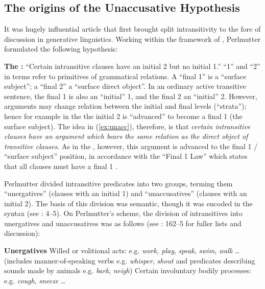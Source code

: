 \documentclass[output=paper]{langsci/langscibook}
\begin{document}
\subsection{The origins of the Unaccusative Hypothesis}

It was  hugely influential article that first brought
split intransitivity to the fore of discussion in generative linguistics.
Working within the framework of , Perlmutter formulated the
following hypothesis:

\ea\label{ex:unacc}\textbf{The :} \enquote{Certain
    intransitive clauses have an initial 2 but no initial
    1.}\hfill\parencite[160]{Perlmutter1978}
\z
\enquote{1} and \enquote{2} in  terms refer to primitives of
grammatical relations. A \enquote{final 1} is a \enquote{surface subject}; a
\enquote{final 2} a \enquote{surface direct object}. In an ordinary active
transitive sentence, the final 1 is also an \enquote{initial} 1, and the final
2 an \enquote{initial} 2.  However, arguments may change relation between the
initial and final levels (\enquote{strata}); hence for example in the 
the initial 2 is \enquote{advanced} to become a final 1 (the surface subject).
The idea in (\ref{ex:unacc}), therefore, is that \emph{certain intransitive
    clauses have an argument which bears the same relation as the direct object
    of transitive clauses}. As in the , however, this argument is
    advanced to the final 1 / \enquote{surface subject} position, in accordance
    with the \enquote{Final 1 Law} which states that all clauses must have a
    final 1 \parencite[160]{Perlmutter1978}.

Perlmutter divided intransitive predicates into two groups, terming them
\enquote{unergatives} (clauses with an initial 1) and \enquote{unaccusatives}
(clauses with an initial 2). The basis of this division was semantic, though it
was encoded in the syntax (see \citealt{LevinRappaportHovav1995}: 4–5). On
Perlmutter’s scheme, the division of intransitives into unergatives and
unaccusatives was as follows (see \citealt{Perlmutter1978}: 162–5 for fuller
lists and discussion):

\ea\label{ex:19.19} \textbf{Unergatives}
    \ea Willed or volitional acts: e.g. \emph{work, play}, \emph{speak}, \emph{swim}, \emph{walk} \dots{} (includes manner-of-speaking verbs e.g. \emph{whisper}, \emph{shout} and predicates describing sounds made by animals e.g. \emph{bark}, \emph{neigh})
    \ex Certain involuntary bodily processes: e.g. \emph{cough}, \emph{sneeze} \dots{}
    \z
\z
\end{document}

